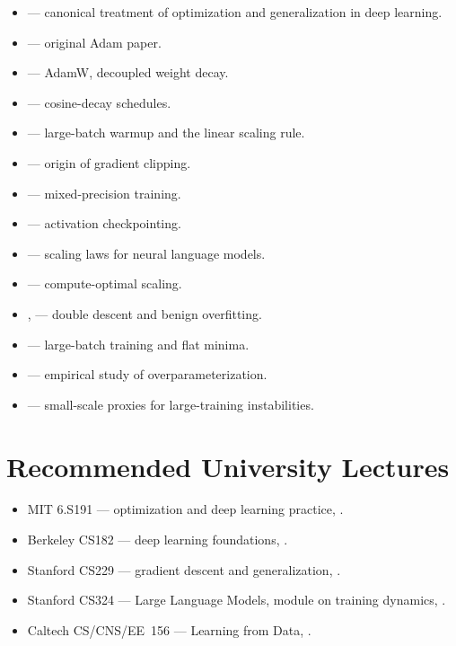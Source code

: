 \begin{itemize}
  \item \citet{goodfellow2016dl} — canonical treatment of optimization
        and generalization in deep learning.
  \item \citet{kingma2015adam} — original Adam paper.
  \item \citet{loshchilov2019decoupled} — AdamW, decoupled weight
        decay.
  \item \citet{loshchilov2017sgdr} — cosine-decay schedules.
  \item \citet{goyal2017accurate} — large-batch warmup and the linear
        scaling rule.
  \item \citet{pascanu2013difficulty} — origin of gradient clipping.
  \item \citet{micikevicius2018mixed} — mixed-precision training.
  \item \citet{chen2016training} — activation checkpointing.
  \item \citet{kaplan2020scaling} — scaling laws for neural language
        models.
  \item \citet{hoffmann2022chinchilla} — compute-optimal scaling.
  \item \citet{nakkiran2020double}, \citet{belkin2019reconciling} —
        double descent and benign overfitting.
  \item \citet{keskar2017large} — large-batch training and flat
        minima.
  \item \citet{zhang2017understanding} — empirical study of
        overparameterization.
  \item \citet{wortsman2023stable} — small-scale proxies for
        large-training instabilities.
\end{itemize}

\section{Recommended University Lectures}

\begin{itemize}
  \item MIT 6.S191 --- optimization and deep learning practice,
        \citet{mit_6s191}.
  \item Berkeley CS182 --- deep learning foundations,
        \citet{berkeley_cs182}.
  \item Stanford CS229 --- gradient descent and generalization,
        \citet{stanford_cs229}.
  \item Stanford CS324 --- Large Language Models, module on training
        dynamics, \citet{stanford_cs324}.
  \item Caltech CS/CNS/EE~156 --- Learning from Data,
        \citet{caltech_cs156}.
\end{itemize}

